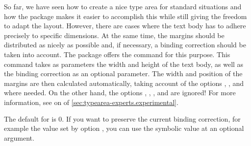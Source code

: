 \begin{Declaration}
\end{Declaration}%
So far, we have seen how to create a nice type area for
standard situations and how the  package makes it easier to
accomplish this while still giving the freedom to adapt the layout. However,
there are cases where the text body has to adhere precisely to specific
dimensions. At the same time, the margins should be distributed as nicely as
possible and, if necessary, a binding correction should be taken into account.
The  package offers the command  for this
purpose. This command takes as parameters the width and height of the text
body, as well as the binding correction as an optional parameter. The width
and position of the margins are then calculated automatically, taking account
of the options ,
,
 and
 where needed.  On the other
hand, the options
,
,
, and
 are ignored!
For more information, see  on
 of
\autoref{sec:typearea-experts.experimental}.

The default for  is 0. If you want to preserve the
current binding correction, for example the value set by option
, you can use the symbolic
value  at an optional argument.

